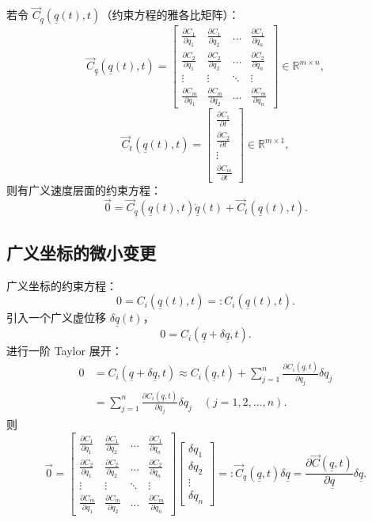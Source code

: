 若令 \( \vec{C}_{\underline{q}}(\underline{q}(t), t) \)（约束方程的雅各比矩阵）：
\[
\vec{C}_{\underline{q}}(\underline{q}(t), t) = 
\begin{bmatrix}
\frac{\partial C_1}{\partial q_1} & \frac{\partial C_1}{\partial q_2} & \dots & \frac{\partial C_1}{\partial q_n} \\
\frac{\partial C_2}{\partial q_1} & \frac{\partial C_2}{\partial q_2} & \dots & \frac{\partial C_2}{\partial q_n} \\
\vdots & \vdots & \ddots & \vdots \\
\frac{\partial C_m}{\partial q_1} & \frac{\partial C_m}{\partial q_2} & \dots & \frac{\partial C_m}{\partial q_n}
\end{bmatrix} \in \mathbb{R}^{m \times n},
\]
\[
\vec{C}_t(\underline{q}(t), t) = 
\begin{bmatrix}
\frac{\partial C_1}{\partial t} \\
\frac{\partial C_2}{\partial t} \\
\vdots \\
\frac{\partial C_m}{\partial t}
\end{bmatrix} \in \mathbb{R}^{m \times 1},
\]
则有广义速度层面的约束方程：
\[
\vec{0} = \vec{C}_{\underline{q}}(\underline{q}(t), t) \dot{\underline{q}}(t) + \vec{C}_t(\underline{q}(t), t).
\]

\subsection{广义坐标的微小变更}
广义坐标的约束方程：
\[
0 = C_i(\underline{q}(t), t) =: C_i(\underline{q}(t), t).
\]
引入一个广义虚位移 \( \delta \underline{q}(t) \)，
\[
0 = C_i(\underline{q} + \delta \underline{q}, t).
\]
进行一阶 Taylor 展开：
\[
\begin{aligned}
0 &= C_i(\underline{q} + \delta \underline{q}, t) \approx C_i(\underline{q}, t) + \sum_{j=1}^n \frac{\partial C_i(\underline{q}, t)}{\partial q_j} \delta q_j \\
&= \sum_{j=1}^n \frac{\partial C_i(\underline{q}, t)}{\partial q_j} \delta q_j \quad (j=1,2,\dots,n).
\end{aligned}
\]
则
\[
\vec{0} = 
\begin{bmatrix}
\frac{\partial C_1}{\partial q_1} & \frac{\partial C_1}{\partial q_2} & \dots & \frac{\partial C_1}{\partial q_n} \\
\frac{\partial C_2}{\partial q_1} & \frac{\partial C_2}{\partial q_2} & \dots & \frac{\partial C_2}{\partial q_n} \\
\vdots & \vdots & \ddots & \vdots \\
\frac{\partial C_m}{\partial q_1} & \frac{\partial C_m}{\partial q_2} & \dots & \frac{\partial C_m}{\partial q_n}
\end{bmatrix}
\begin{bmatrix}
\delta q_1 \\
\delta q_2 \\
\vdots \\
\delta q_n
\end{bmatrix}
=: \vec{C}_{\underline{q}}(\underline{q}, t) \delta \underline{q} = \frac{\partial \vec{C}(\underline{q}, t)}{\partial \underline{q}} \delta \underline{q}.
\]

